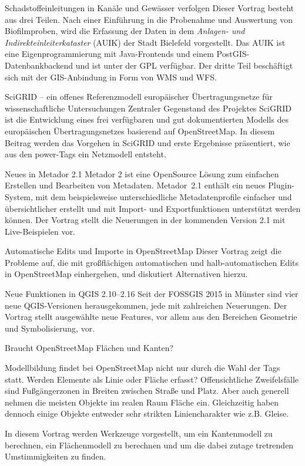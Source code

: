 %
{Schadstoffeinleitungen in Kanäle und Gewässer verfolgen}%
{}%
{Dieser Vortrag besteht aus drei Teilen.
Nach einer Einführung in die Probenahme und Auswertung von Biofilmproben,
wird die Erfassung der Daten in dem \emph{Anlagen- und Indirekteinleiterkataster} (AUIK) der Stadt Bielefeld
vorgestellt. Das AUIK ist eine Eigenprogrammierung mit Java-Frontends und einem
PostGIS-Datenbank\-backend und ist unter der GPL verfügbar.
Der dritte Teil beschäftigt sich mit der GIS-Anbindung in Form von WMS und WFS.
}

%
{SciGRID -- ein offenes Referenzmodell europäischer Übertragungsnetze für wissenschaftliche Untersuchungen}%
{}%
{Zentraler Gegenstand  des Projektes SciGRID ist die Entwicklung eines frei verfügbaren
und gut dokumentierten Modells des europäischen Übertragungsnetzes basierend auf
OpenStreetMap. In diesem Beitrag werden das Vorgehen in SciGRID und erste
Ergebnisse präsentiert, wie aus den power-Tags ein Netzmodell entsteht.}

%
{Neues in Metador 2.1}%
{}%
{Metador 2 ist eine OpenSource Lösung zum einfachen Erstellen und Bearbeiten von Metadaten.
Metador~2.1 enthält ein neues Plugin-System, mit dem beispielsweise unterschiedliche Metadatenprofile
einfacher und übersichtlicher erstellt und mit Import- und Exportfunktionen unterstützt werden können.
Der Vortrag stellt die Neuerungen in der kommenden Version 2.1 mit Live-Beispielen vor.}

%
{Automatische Edits und Importe in OpenStreetMap}%
{}%
{Dieser Vortrag zeigt die Probleme auf, die mit großflächigen automatischen und halb-automatischen Edits in OpenStreetMap einhergehen, und diskutiert Alternativen hierzu. }

%
{Neue Funktionen in QGIS 2.10--2.16}%
{}%
{Seit der FOSSGIS 2015 in Münster sind vier neue QGIS-Versionen herausgekommen,
jede mit zahlreichen Neuerungen. Der Vortrag stellt ausgewählte neue Features,
vor allem aus den Bereichen Geometrie und Symbolisierung, vor.}

%
{Braucht OpenStreetMap Flächen und Kanten?}%
{}%
{Modellbildung findet bei OpenStreetMap nicht nur durch die Wahl der Tags statt.
Werden Elemente als Linie oder Fläche erfasst?
Offensichtliche Zweifelsfälle sind Fußgängerzonen in Breiten zwischen Straße und Platz.
Aber auch generell nehmen die meisten Objekte im realen Raum Fläche ein.
Gleichzeitig haben dennoch einige Objekte entweder sehr strikten Liniencharakter wie z.B. Gleise.

In diesem Vortrag werden Werkzeuge vorgestellt,
um ein Kantenmodell zu berechnen, ein Flächenmodell zu berechnen
und um die dabei zutage tretrenden Umstimmigkeiten zu finden.
}


